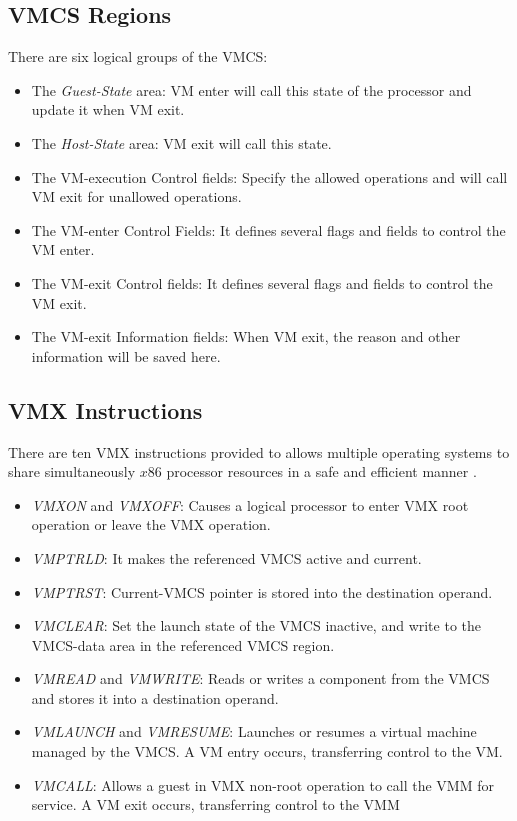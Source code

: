 \documentclass[letterpaper,10pt,onecolumn]{IEEEtran}
\begin{document}
\subsection{VMCS Regions}
There are six logical groups of the VMCS:
\begin{itemize}
  \item The \emph{Guest-State} area: VM enter will call this state of the processor and update it when VM exit.
  \item The \emph{Host-State} area: VM exit will call this state.
  \item The VM-execution Control fields: Specify the allowed operations and will call VM exit for unallowed operations.
    \item The VM-enter Control Fields: It defines several flags and fields to control the VM enter.
  \item The VM-exit Control fields:  It defines several flags and fields to control the VM exit.
  \item The VM-exit Information fields: When VM exit, the reason and other information will be saved here.
\end{itemize}

\subsection{VMX Instructions}
There are ten VMX instructions provided to allows multiple operating systems to share simultaneously $x86$ processor resources in a safe and efficient manner \cite{WMXinstructions}.
\begin{itemize}
  \item \emph{VMXON} and \emph{VMXOFF}: Causes a logical processor to enter VMX root operation or leave the VMX operation.
  \item \emph{VMPTRLD}: It makes the referenced VMCS active and current.
   \item \emph{VMPTRST}: Current-VMCS pointer is stored into the destination operand.
  \item \emph{VMCLEAR}: Set the launch state of the VMCS inactive, and write to the VMCS-data area in the referenced VMCS region.
  \item \emph{VMREAD} and \emph{VMWRITE}: Reads or writes a component from the VMCS and stores it into a destination operand.
  \item \emph{VMLAUNCH} and \emph{VMRESUME}: Launches or resumes a virtual machine managed by the VMCS. A VM entry occurs, transferring control to the VM.
  \item \emph{VMCALL}: Allows a guest in VMX non-root operation to call the VMM for service. A VM exit occurs, transferring control to the VMM
\end{itemize}
\end{document}

